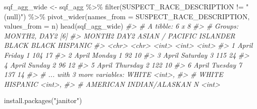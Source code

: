 \documentclass[
]{krantz}
\makeatletter
\newenvironment{Shaded}{\begin{snugshade}}{\end{snugshade}}
\newcommand{\AttributeTok}[1]{\textcolor[rgb]{0.61,0.61,0.61}{#1}}
\newcommand{\CommentTok}[1]{\textcolor[rgb]{0.37,0.37,0.37}{\textit{#1}}}
\newcommand{\FunctionTok}[1]{\textcolor[rgb]{0,0,0}{#1}}
\newcommand{\NormalTok}[1]{#1}
\newcommand{\OtherTok}[1]{\textcolor[rgb]{0.37,0.37,0.37}{#1}}
\newcommand{\SpecialCharTok}[1]{\textcolor[rgb]{0,0,0}{#1}}
\newcommand{\StringTok}[1]{\textcolor[rgb]{0.5,0.5,0.5}{#1}}
\newenvironment{kframe}{%
\medskip{}
\setlength{\fboxsep}{.8em}
 \def\at@end@of@kframe{}%
 \ifinner\ifhmode%
  \def\at@end@of@kframe{\end{minipage}}%
  \begin{minipage}{\columnwidth}%
 \fi\fi%
 \def\FrameCommand##1{\hskip\@totalleftmargin \hskip-\fboxsep
 \colorbox{shadecolor}{##1}\hskip-\fboxsep
     \hskip-\linewidth \hskip-\@totalleftmargin \hskip\columnwidth}%
 \MakeFramed {\advance\hsize-\width
   \@totalleftmargin\z@ \linewidth\hsize
   \@setminipage}}%
 {\par\unskip\endMakeFramed%
 \at@end@of@kframe}
\renewenvironment{Shaded}{\begin{kframe}}{\end{kframe}}
\makeatother
\begin{document}
\begin{Shaded}
\begin{Highlighting}[]
\NormalTok{sqf\_agg\_wide }\OtherTok{\textless{}{-}}\NormalTok{ sqf\_agg }\SpecialCharTok{\%\textgreater{}\%}
  \FunctionTok{filter}\NormalTok{(SUSPECT\_RACE\_DESCRIPTION }\SpecialCharTok{!=} \StringTok{"(null)"}\NormalTok{) }\SpecialCharTok{\%\textgreater{}\%}
  \FunctionTok{pivot\_wider}\NormalTok{(}\AttributeTok{names\_from =}\NormalTok{ SUSPECT\_RACE\_DESCRIPTION, }\AttributeTok{values\_from =}\NormalTok{ n) }
\FunctionTok{head}\NormalTok{(sqf\_agg\_wide)}
\CommentTok{\#\textgreater{} \# A tibble: 6 x 8}
\CommentTok{\#\textgreater{} \# Groups:   MONTH2, DAY2 [6]}
\CommentTok{\#\textgreater{}   MONTH2 DAY2     \textasciigrave{}ASIAN / PACIFIC ISLANDER\textasciigrave{} BLACK \textasciigrave{}BLACK HISPANIC\textasciigrave{}}
\CommentTok{\#\textgreater{}   \textless{}chr\textgreater{}  \textless{}chr\textgreater{}                         \textless{}int\textgreater{} \textless{}int\textgreater{}            \textless{}int\textgreater{}}
\CommentTok{\#\textgreater{} 1 April  Friday                            1   104               17}
\CommentTok{\#\textgreater{} 2 April  Monday                            1    92               10}
\CommentTok{\#\textgreater{} 3 April  Saturday                          3   115               24}
\CommentTok{\#\textgreater{} 4 April  Sunday                            2    96               12}
\CommentTok{\#\textgreater{} 5 April  Thursday                          2   122               10}
\CommentTok{\#\textgreater{} 6 April  Tuesday                           7   137               14}
\CommentTok{\#\textgreater{} \# ... with 3 more variables: WHITE \textless{}int\textgreater{},}
\CommentTok{\#\textgreater{} \#   WHITE HISPANIC \textless{}int\textgreater{},}
\CommentTok{\#\textgreater{} \#   AMERICAN INDIAN/ALASKAN N \textless{}int\textgreater{}}
\end{Highlighting}
\end{Shaded}

\begin{Shaded}
\begin{Highlighting}[]
\FunctionTok{install.packages}\NormalTok{(}\StringTok{"janitor"}\NormalTok{)}
\end{Highlighting}
\end{Shaded}
\end{document}
